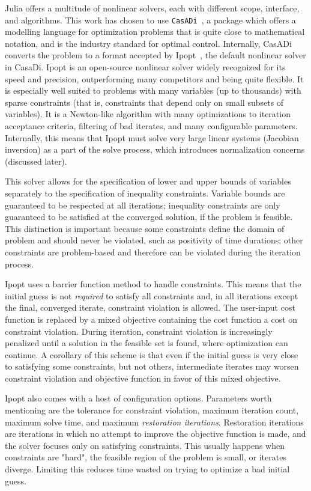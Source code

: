 Julia offers a multitude of nonlinear solvers, each with different scope, interface, and algorithms. This work has chosen to use \texttt{CasADi}~\cite{casadi}, a package which offers a modelling language for optimization problems that is quite close to mathematical notation, and is the industry standard for optimal control. Internally, CasADi converts the problem to a format accepted by Ipopt~\cite{ipopt}, the default nonlinear solver in CasaDi. Ipopt is an open-source nonlinear solver widely recognized for its speed and precision, outperforming many competitors and being quite flexible. It is especially well suited to problems with many variables (up to thousands) with sparse constraints (that is, constraints that depend only on small subsets of variables). It is a Newton-like algorithm with many optimizations to iteration acceptance criteria, filtering of bad iterates, and many configurable parameters. Internally, this means that Ipopt must solve very large linear systems (Jacobian inversion) as a part of the solve process, which introduces normalization concerns (discussed later).

This solver allows for the specification of lower and upper bounds of variables separately to the specification of inequality constraints. Variable bounds are guaranteed to be respected at all iterations; inequality constraints are only guaranteed to be satisfied at the converged solution, if the problem is feasible. This distinction is important because some constraints define the domain of problem and should never be violated, such as positivity of time durations; other constraints are problem-based and therefore can be violated during the iteration process.

Ipopt uses a barrier function method to handle constraints. This means that the initial guess is not \textit{required} to satisfy all constraints and, in all iterations except the final, converged iterate, constraint violation is allowed. The user-input cost function is replaced by a mixed objective containing the cost function a cost on constraint violation. During iteration, constraint violation is increasingly penalized until a solution in the feasible set is found, where optimization can continue. A corollary of this scheme is that even if the initial guess is very close to satisfying some constraints, but not others, intermediate iterates may worsen constraint violation and objective function in favor of this mixed objective.

Ipopt also comes with a host of configuration options. Parameters worth mentioning are the tolerance for constraint violation, maximum iteration count, maximum solve time, and maximum \textit{restoration iterations}. Restoration iterations are iterations in which no attempt to improve the objective function is made, and the solver focuses only on satisfying constraints. This usually happens when constraints are "hard", the feasible region of the problem is small, or iterates diverge. Limiting this reduces time wasted on trying to optimize a bad initial guess.

